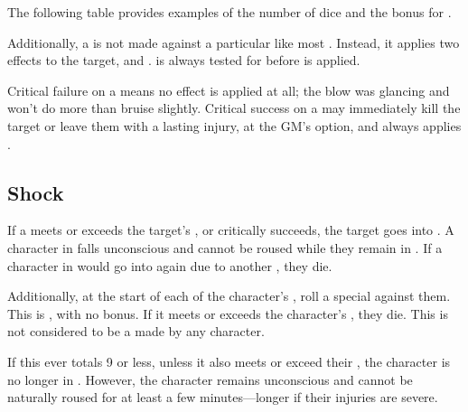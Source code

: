 The following table provides examples of the number of dice and the bonus for {\damagetests}.


Additionally, a {\damagetest} is not made against a particular {\tn} like most {\tests}.
Instead, it applies two effects to the target, {\shock} and {\damage}.
\capital{\shock} is always tested for before {\damage} is applied.

Critical failure on a {\damagetest} means no effect is applied at all; the blow was glancing and won't do more than bruise slightly.
Critical success on a {\damagetest} may immediately kill the target or leave them with a lasting injury, at the GM's option, and always applies {\shock}.

\subsection{Shock}

If a {\damagetest} meets or exceeds the target's , or critically succeeds, the target goes into {\shock}.
A character in {\shock} falls unconscious and cannot be roused while they remain in {\shock}.
If a character in {\shock} would go into {\shock} again due to another {\damagetest}, they die.

Additionally, at the start of each of the {\shocked} character's {\turns}, roll a special {\test} against them.
This {\test} is , with no bonus.
If it meets or exceeds the {\shocked} character's , they die.
This {\test} is not considered to be a {\test} made by any character.

If this {\test} ever totals 9 or less, unless it also meets or exceed their , the character is no longer in {\shock}.
However, the character remains unconscious and cannot be naturally roused for at least a few minutes---longer if their injuries are severe.

